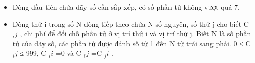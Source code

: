 \begin{itemize}
	\item Dòng đầu tiên chứa dãy số cần sắp xếp, có số phần tử không vượt quá 7.
	\item Dòng thứ i trong số N dòng tiếp theo chứa N số nguyên, số thứ j cho biết C $_ ij $ , chi phí để đổi chỗ phần tử ở vị trí thứ i và vị trí thứ j. Biết N là số phần tử của dãy số, các phần tử được đánh số từ 1 đến N từ trái sang phải. 0 ≤ C $_ ij $ ≤ 999, C $_ ii $ =0 và C $_ ij $ =C $_ ji $ .
\end{itemize}

\